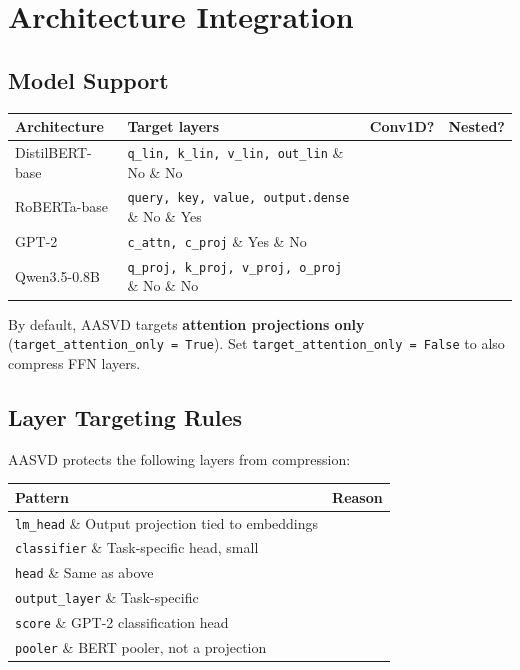 
\section{Architecture Integration}

\subsection{Model Support}

\begin{table}[H]
\centering
\small
\begin{tabular}{llll}
\toprule
\textbf{Architecture} & \textbf{Target layers} & \textbf{Conv1D?} & \textbf{Nested?} \\
\midrule
DistilBERT-base & \texttt{q\_lin, k\_lin, v\_lin, out\_lin} \& No \& No \\
RoBERTa-base & \texttt{query, key, value, output.dense} \& No \& Yes \\
GPT-2 & \texttt{c\_attn, c\_proj} \& Yes \& No \\
Qwen3.5-0.8B & \texttt{q\_proj, k\_proj, v\_proj, o\_proj} \& No \& No \\
\bottomrule
\end{tabular}
\end{table}

By default, AASVD targets \textbf{attention projections only} 
(\texttt{target\_attention\_only = True}). Set \texttt{target\_attention\_only = False} to 
also compress FFN layers.

\subsection{Layer Targeting Rules}

AASVD protects the following layers from compression:

\begin{table}[H]
\centering
\small
\begin{tabular}{ll}
\toprule
\textbf{Pattern} & \textbf{Reason} \\
\midrule
\texttt{lm\_head} \& Output projection tied to embeddings \\
\texttt{classifier} \& Task-specific head, small \\
\texttt{head} \& Same as above \\
\texttt{output\_layer} \& Task-specific \\
\texttt{score} \& GPT-2 classification head \\
\texttt{pooler} \& BERT pooler, not a projection \\
\bottomrule
\end{tabular}
\end{table}

